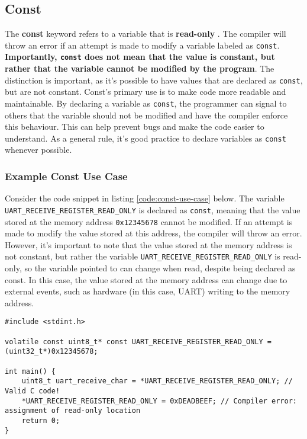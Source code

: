 \documentclass[main.tex]{subfiles}
\begin{document}
\subsection{Const}
The \textbf{const} keyword refers to a variable that is \textbf{read-only} \cite{beningoConst}. The compiler will throw an error if an attempt is made to modify a variable labeled as \texttt{const}. \textbf{Importantly, \texttt{const} does not mean that the value is constant, but rather that the variable cannot be modified by the program}. The distinction is important, as it's possible to have values that are declared as \texttt{const}, but are not constant. 
\newline
\newline
\noindent Const's primary use is to make code more readable and maintainable. By declaring a variable as \texttt{const}, the programmer can signal to others that the variable should not be modified and have the compiler enforce this behaviour. This can help prevent bugs and make the code easier to understand. As a general rule, it's good practice to declare variables as \texttt{const} whenever possible.

\subsubsection{Example Const Use Case}
Consider the code snippet in listing \ref{code:const-use-case} below. The variable \texttt{UART\_RECEIVE\_REGISTER\_READ\_ONLY} is declared as \texttt{const}, meaning that the value stored at the memory address \texttt{0x12345678} cannot be modified. If an attempt is made to modify the value stored at this address, the compiler will throw an error. However, it's important to note that the value stored at the memory address is not constant, but rather the variable \texttt{UART\_RECEIVE\_REGISTER\_READ\_ONLY} is read-only, so the variable pointed to can change when read, despite being declared as const. In this case, the value stored at the memory address can change due to external events, such as hardware (in this case, UART) writing to the memory address.

\begin{lstlisting}[caption={Example use case of Const}, label={code:const-use-case}]
#include <stdint.h>

volatile const uint8_t* const UART_RECEIVE_REGISTER_READ_ONLY = (uint32_t*)0x12345678;

int main() {
    uint8_t uart_receive_char = *UART_RECEIVE_REGISTER_READ_ONLY; // Valid C code!
    *UART_RECEIVE_REGISTER_READ_ONLY = 0xDEADBEEF; // Compiler error: assignment of read-only location
    return 0;
}
\end{lstlisting}
\end{document}
